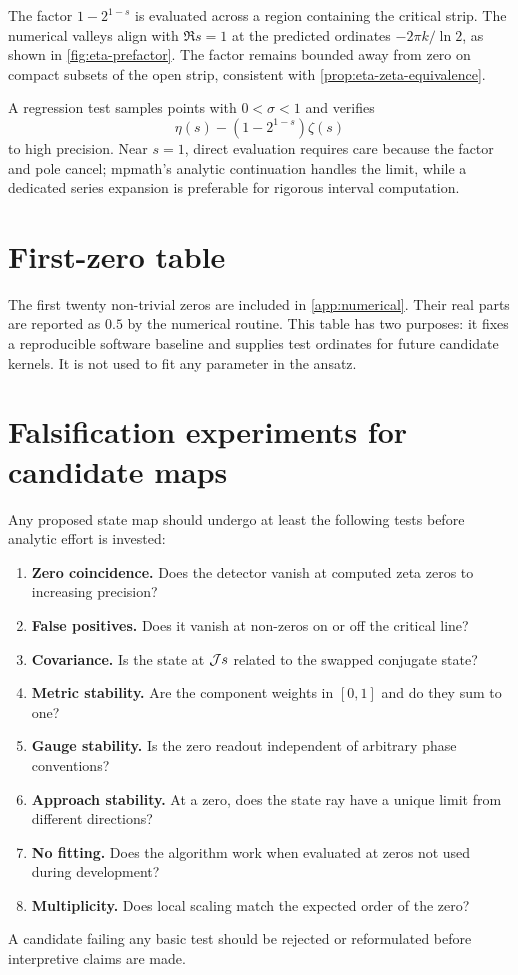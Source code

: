 The factor $1-2^{1-s}$ is evaluated across a region containing the critical strip. The numerical valleys align with $\Re s=1$ at the predicted ordinates $-2\pi k/\ln2$, as shown in \cref{fig:eta-prefactor}. The factor remains bounded away from zero on compact subsets of the open strip, consistent with \cref{prop:eta-zeta-equivalence}.

A regression test samples points with $0<\sigma<1$ and verifies
\[
 \eta(s)-(1-2^{1-s})\zeta(s)
\]
to high precision. Near $s=1$, direct evaluation requires care because the factor and pole cancel; mpmath's analytic continuation handles the limit, while a dedicated series expansion is preferable for rigorous interval computation.

\section{First-zero table}

The first twenty non-trivial zeros are included in \cref{app:numerical}. Their real parts are reported as $0.5$ by the numerical routine. This table has two purposes: it fixes a reproducible software baseline and supplies test ordinates for future candidate kernels. It is not used to fit any parameter in the ansatz.

\section{Falsification experiments for candidate maps}

Any proposed state map should undergo at least the following tests before analytic effort is invested:
\begin{enumerate}
  \item \textbf{Zero coincidence.} Does the detector vanish at computed zeta zeros to increasing precision?
  \item \textbf{False positives.} Does it vanish at non-zeros on or off the critical line?
  \item \textbf{Covariance.} Is the state at $\mathcal{J} s$ related to the swapped conjugate state?
  \item \textbf{Metric stability.} Are the component weights in $[0,1]$ and do they sum to one?
  \item \textbf{Gauge stability.} Is the zero readout independent of arbitrary phase conventions?
  \item \textbf{Approach stability.} At a zero, does the state ray have a unique limit from different directions?
  \item \textbf{No fitting.} Does the algorithm work when evaluated at zeros not used during development?
  \item \textbf{Multiplicity.} Does local scaling match the expected order of the zero?
\end{enumerate}
A candidate failing any basic test should be rejected or reformulated before interpretive claims are made.


